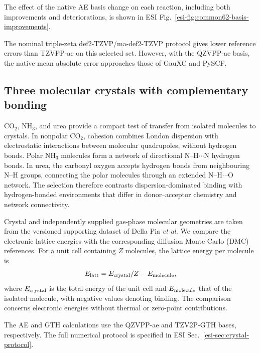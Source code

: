 \documentclass[10pt,a4paper,twocolumn]{article}
\begin{document}
The effect of the native AE basis change on each reaction, including both improvements and deteriorations, is shown in ESI Fig.~\ref{esi-fig:common62-basis-improvements}.

The nominal triple-zeta def2-TZVP/ma-def2-TZVP protocol gives lower reference errors than TZVPP-ae on this selected set. However, with the QZVPP-ae basis, the native mean absolute error approaches those of GauXC and PySCF.

\subsection{Three molecular crystals with complementary bonding}
\label{sec:crystal-results}

CO$_2$, NH$_3$, and urea provide a compact test of transfer from isolated molecules to crystals. In nonpolar CO$_2$, cohesion combines London dispersion with electrostatic interactions between molecular quadrupoles, without hydrogen bonds. Polar NH$_3$ molecules form a network of directional N--H$\cdots$N hydrogen bonds. In urea, the carbonyl oxygen accepts hydrogen bonds from neighbouring N--H groups, connecting the polar molecules through an extended N--H$\cdots$O network.\cite{Morrison2003HydrogenBonds} The selection therefore contrasts dispersion-dominated binding with hydrogen-bonded environments that differ in donor--acceptor chemistry and network connectivity.

Crystal and independently supplied gas-phase molecular geometries are taken from the versioned supporting dataset of Della Pia \emph{et al.}\cite{DellaPia2024X23} We compare the electronic lattice energies with the corresponding diffusion Monte Carlo (DMC) references. For a unit cell containing $Z$ molecules, the lattice energy per molecule is
\begin{equation}
 E_{\rm latt}=E_{\rm crystal}/Z-E_{\rm molecule},
 \label{eq:lattice}
\end{equation}
where $E_{\rm crystal}$ is the total energy of the unit cell and $E_{\rm molecule}$ that of the isolated molecule, with negative values denoting binding. The comparison concerns electronic energies without thermal or zero-point contributions.

 The AE and GTH calculations use the QZVPP-ae and TZV2P-GTH bases, respectively. The full numerical protocol is specified in ESI Sec.~\ref{esi-sec:crystal-protocol}.
\end{document}
